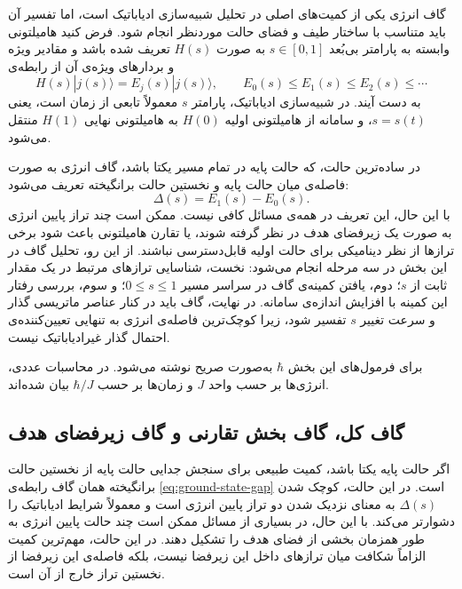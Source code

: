 گاف انرژی یکی از کمیت‌های اصلی در تحلیل شبیه‌سازی ادیاباتیک است، اما
تفسیر آن باید متناسب با ساختار طیف و فضای حالت موردنظر انجام شود.
فرض کنید هامیلتونی وابسته به پارامتر بی‌بُعد $s\in[0,1]$ به صورت
$H(s)$ تعریف شده باشد و مقادیر ویژه و بردارهای ویژه‌ی آن از رابطه‌ی
\begin{equation}
	H(s)|j(s)\rangle = E_j(s)|j(s)\rangle,
	\qquad
	E_0(s)\leq E_1(s)\leq E_2(s)\leq\cdots
\end{equation}
به دست آیند. در شبیه‌سازی ادیاباتیک، پارامتر $s$ معمولاً تابعی از زمان
است، یعنی $s=s(t)$، و سامانه از هامیلتونی اولیه $H(0)$ به هامیلتونی
نهایی $H(1)$ منتقل می‌شود.

در ساده‌ترین حالت، که حالت پایه در تمام مسیر یکتا باشد، گاف انرژی
به صورت فاصله‌ی میان حالت پایه و نخستین حالت برانگیخته تعریف می‌شود:
\begin{equation}
	\Delta(s)=E_1(s)-E_0(s).
	\label{eq:ground-state-gap}
\end{equation}
با این حال، این تعریف در همه‌ی مسائل کافی نیست. ممکن است چند تراز
پایین انرژی به صورت یک زیر‌فضای هدف در نظر گرفته شوند، یا تقارن
هامیلتونی باعث شود برخی ترازها از نظر دینامیکی برای حالت اولیه
قابل‌دسترسی نباشند. از این رو، تحلیل گاف در این بخش در سه مرحله انجام
می‌شود: نخست، شناسایی ترازهای مرتبط در یک مقدار ثابت از $s$؛ دوم،
یافتن کمینه‌ی گاف در سراسر مسیر $0\leq s\leq1$؛ و سوم، بررسی رفتار
این کمینه با افزایش اندازه‌ی سامانه. در نهایت، گاف باید در کنار
عناصر ماتریسی گذار و سرعت تغییر $s$ تفسیر شود، زیرا کوچک‌ترین فاصله‌ی
انرژی به تنهایی تعیین‌کننده‌ی احتمال گذار غیرادیاباتیک نیست.

برای فرمول‌های این بخش $\hbar$ به‌صورت صریح نوشته می‌شود. در
محاسبات عددی، انرژی‌ها بر حسب واحد $J$ و زمان‌ها بر حسب
$\hbar/J$ بیان شده‌اند.

\subsection{گاف کل، گاف بخش تقارنی و گاف زیر‌فضای هدف}
\label{subsec:gap-types}

اگر حالت پایه یکتا باشد، کمیت طبیعی برای سنجش جدایی حالت پایه از
نخستین حالت برانگیخته همان گاف رابطه‌ی
\eqref{eq:ground-state-gap} است. در این حالت، کوچک شدن
$\Delta(s)$ به معنای نزدیک شدن دو تراز پایین انرژی است و معمولاً
شرایط ادیاباتیک را دشوارتر می‌کند. با این حال، در بسیاری از مسائل
ممکن است چند حالت پایین انرژی به طور همزمان بخشی از فضای هدف را
تشکیل دهند. در این حالت، مهم‌ترین کمیت الزاماً شکافت میان ترازهای
داخل این زیر‌فضا نیست، بلکه فاصله‌ی این زیر‌فضا از نخستین تراز
خارج از آن است.


